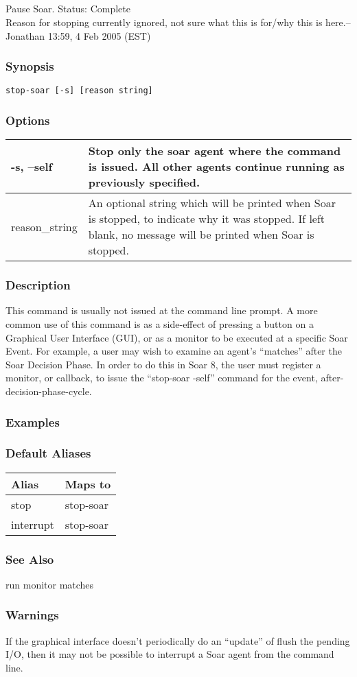 \subsection{}
\label{stop-soar}
Pause Soar. 
 Status: Complete\\ 
Reason for stopping currently ignored, not sure what this is for/why this is here.--Jonathan 13:59, 4 Feb 2005 (EST) 
\subsubsection*{Synopsis}
\begin{verbatim}
stop-soar [-s] [reason string]
\end{verbatim}
\subsubsection*{Options}
\begin{tabular}{|l|l|}
\hline 
 -s, --self  & Stop only the soar agent where the command is issued. All other agents continue running as previously specified.  \\
 \hline 
 reason\_string  & An optional string which will be printed when Soar is stopped, to indicate why it was stopped. If left blank, no message will be printed when Soar is stopped.  \\
 \hline 
\end{tabular}
\subsubsection*{Description}
 This command is usually not issued at the command line prompt. A more common use of this command is as a side-effect of pressing a button on a Graphical User Interface (GUI), or as a monitor to be executed at a specific Soar Event. For example, a user may wish to examine an agent's ``matches'' after the Soar Decision Phase. In order to do this in Soar 8, the user must register a monitor, or callback, to issue the ``stop-soar -self'' command for the event, after-decision-phase-cycle. 
\subsubsection*{Examples}
\subsubsection*{Default Aliases}
\begin{tabular}{|l|l|}
\hline 
 Alias  & Maps to  \\
 \hline 
 stop  & stop-soar  \\
 \hline 
 interrupt  & stop-soar  \\
 \hline 
\end{tabular}
\subsubsection*{See Also}
 run monitor matches
\subsubsection*{Warnings}
 If the graphical interface doesn't periodically do an ``update'' of flush the pending I/O, then it may not be possible to interrupt a Soar agent from the command line. 
